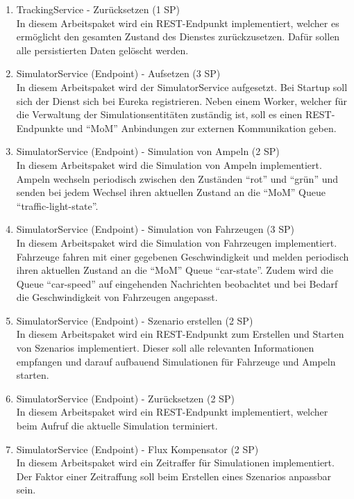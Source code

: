 \begin{enumerate}
  \item TrackingService - Zurücksetzen (1 SP)\\
 		In diesem Arbeitspaket wird ein REST-Endpunkt implementiert, welcher es ermöglicht den gesamten Zustand des Dienstes zurückzusetzen.
 		Dafür sollen alle persistierten Daten gelöscht werden.
  \item SimulatorService (Endpoint) - Aufsetzen (3 SP)\\
  		In diesem Arbeitspaket wird der SimulatorService aufgesetzt.
  		Bei Startup soll sich der Dienst sich bei Eureka registrieren.
  		Neben einem Worker, welcher für die Verwaltung der Simulationsentitäten zuständig ist, soll es einen REST-Endpunkte und \enquote{MoM} Anbindungen zur externen Kommunikation geben.
  \item SimulatorService (Endpoint) - Simulation von Ampeln (2 SP)\\
  		In diesem Arbeitspaket wird die Simulation von Ampeln implementiert.
  		Ampeln wechseln periodisch zwischen den Zuständen \enquote{rot} und \enquote{grün} und senden bei jedem Wechsel ihren aktuellen Zustand an die \enquote{MoM} Queue \enquote{traffic-light-state}.
  \item SimulatorService (Endpoint) - Simulation von Fahrzeugen (3 SP)\\
  		In diesem Arbeitspaket wird die Simulation von Fahrzeugen implementiert.
  		Fahrzeuge fahren mit einer gegebenen Geschwindigkeit und melden periodisch ihren aktuellen Zustand an die \enquote{MoM} Queue \enquote{car-state}.
  		Zudem wird die Queue \enquote{car-speed} auf eingehenden Nachrichten beobachtet und bei Bedarf die Geschwindigkeit von Fahrzeugen angepasst.
  \item SimulatorService (Endpoint) - Szenario erstellen (2 SP)\\
  		In diesem Arbeitspaket wird ein REST-Endpunkt zum Erstellen und Starten von Szenarios implementiert.
  		Dieser soll alle relevanten Informationen empfangen und darauf aufbauend Simulationen für Fahrzeuge und Ampeln starten.
  \item SimulatorService (Endpoint) - Zurücksetzen (2 SP)\\
  		In diesem Arbeitspaket wird ein REST-Endpunkt implementiert, welcher beim Aufruf die aktuelle Simulation terminiert.
  \item SimulatorService (Endpoint) - Flux Kompensator (2 SP)\\
  		In diesem Arbeitspaket wird ein Zeitraffer für Simulationen implementiert.
  		Der Faktor einer Zeitraffung soll beim Erstellen eines Szenarios anpassbar sein.

\end{enumerate}
